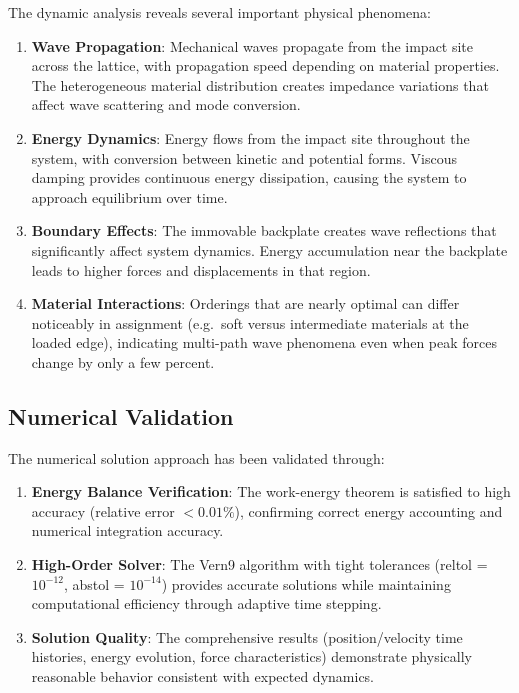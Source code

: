 \documentclass[11pt,a4paper]{article}
\begin{document}
\noindent The dynamic analysis reveals several important physical phenomena:

\begin{enumerate}
    \item \textbf{Wave Propagation}: Mechanical waves propagate from the impact site across the lattice, with propagation speed depending on material properties. The heterogeneous material distribution creates impedance variations that affect wave scattering and mode conversion.
    
    \item \textbf{Energy Dynamics}: Energy flows from the impact site throughout the system, with conversion between kinetic and potential forms. Viscous damping provides continuous energy dissipation, causing the system to approach equilibrium over time.
    
    \item \textbf{Boundary Effects}: The immovable backplate creates wave reflections that significantly affect system dynamics. Energy accumulation near the backplate leads to higher forces and displacements in that region.
    
    \item \textbf{Material Interactions}: Orderings that are nearly optimal can differ noticeably in assignment (e.g.\ soft versus intermediate materials at the loaded edge), indicating multi-path wave phenomena even when peak forces change by only a few percent.
\end{enumerate}

\subsection{Numerical Validation}

\noindent The numerical solution approach has been validated through:

\begin{enumerate}
    \item \textbf{Energy Balance Verification}: The work-energy theorem is satisfied to high accuracy (relative error $< 0.01\%$), confirming correct energy accounting and numerical integration accuracy.
    
    \item \textbf{High-Order Solver}: The Vern9 algorithm with tight tolerances (reltol = $10^{-12}$, abstol = $10^{-14}$) provides accurate solutions while maintaining computational efficiency through adaptive time stepping.
    
    \item \textbf{Solution Quality}: The comprehensive results (position/velocity time histories, energy evolution, force characteristics) demonstrate physically reasonable behavior consistent with expected dynamics.
\end{enumerate}
\end{document}
